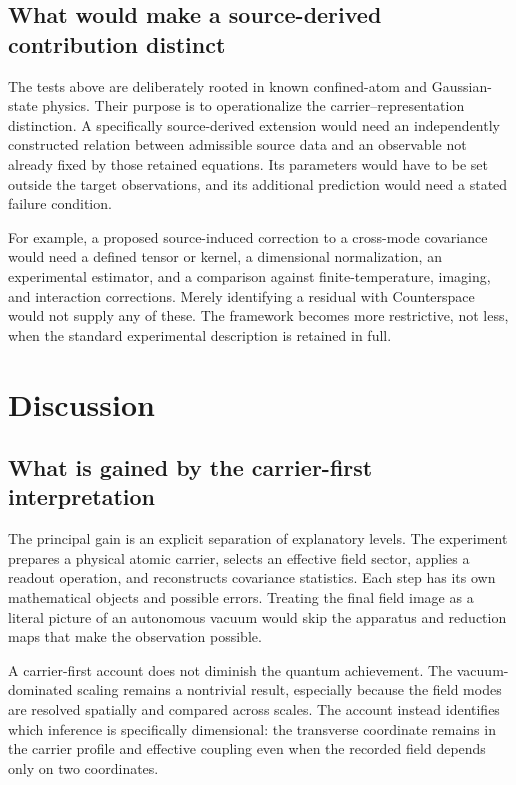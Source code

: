 \documentclass[11pt,a4paper]{article}
\theoremstyle{definition}
\theoremstyle{remark}
\begin{document}
\subsection{What would make a source-derived contribution distinct}
The tests above are deliberately rooted in known confined-atom and Gaussian-state physics. Their purpose is to operationalize the carrier--representation distinction. A specifically source-derived extension would need an independently constructed relation between admissible source data and an observable not already fixed by those retained equations. Its parameters would have to be set outside the target observations, and its additional prediction would need a stated failure condition.\cite{foundation,planck}

For example, a proposed source-induced correction to a cross-mode covariance would need a defined tensor or kernel, a dimensional normalization, an experimental estimator, and a comparison against finite-temperature, imaging, and interaction corrections. Merely identifying a residual with Counterspace would not supply any of these. The framework becomes more restrictive, not less, when the standard experimental description is retained in full.

\section{Discussion}
\label{sec:discussion}
\subsection{What is gained by the carrier-first interpretation}
The principal gain is an explicit separation of explanatory levels. The experiment prepares a physical atomic carrier, selects an effective field sector, applies a readout operation, and reconstructs covariance statistics. Each step has its own mathematical objects and possible errors. Treating the final field image as a literal picture of an autonomous vacuum would skip the apparatus and reduction maps that make the observation possible.\cite{zhang2026}

A carrier-first account does not diminish the quantum achievement. The vacuum-dominated scaling remains a nontrivial result, especially because the field modes are resolved spatially and compared across scales. The account instead identifies which inference is specifically dimensional: the transverse coordinate remains in the carrier profile and effective coupling even when the recorded field depends only on two coordinates.\cite{zhang2026,hadzibabic}
\end{document}
